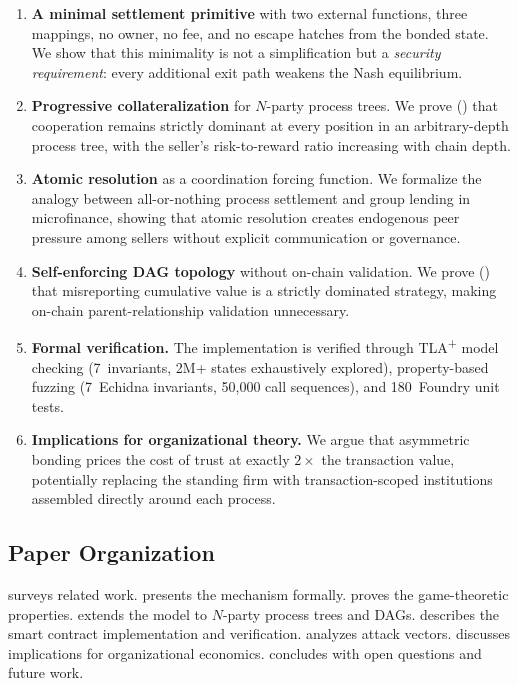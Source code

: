 \documentclass[11pt,a4paper]{article}
\theoremstyle{definition}
\theoremstyle{remark}
\begin{document}
\begin{enumerate}[label=(\roman*)]
  \item \textbf{A minimal settlement primitive} with two external
    functions, three mappings, no owner, no fee, and no escape hatches
    from the bonded state. We show that this minimality is not a
    simplification but a \emph{security requirement}: every additional
    exit path weakens the Nash equilibrium.

  \item \textbf{Progressive collateralization} for $N$-party process
    trees. We prove () that cooperation remains
    strictly dominant at every position in an arbitrary-depth process
    tree, with the seller's risk-to-reward ratio increasing with chain
    depth.

  \item \textbf{Atomic resolution} as a coordination forcing function.
    We formalize the analogy between all-or-nothing process settlement
    and group lending in microfinance, showing that atomic resolution
    creates endogenous peer pressure among sellers without explicit
    communication or governance.

  \item \textbf{Self-enforcing DAG topology} without on-chain
    validation. We prove () that
    misreporting cumulative value is a strictly dominated strategy,
    making on-chain parent-relationship validation unnecessary.

  \item \textbf{Formal verification.} The implementation is verified
    through TLA\textsuperscript{+} model checking (7~invariants,
    2M+ states exhaustively explored), property-based fuzzing (7~Echidna
    invariants, 50{,}000 call sequences), and 180~Foundry unit tests.

  \item \textbf{Implications for organizational theory.} We argue that
    asymmetric bonding prices the cost of trust at exactly $2\times$ the
    transaction value, potentially replacing the standing firm with
    transaction-scoped institutions assembled directly around each
    process.
\end{enumerate}

\subsection{Paper Organization}

 surveys related work.  presents
the mechanism formally.  proves the game-theoretic
properties.  extends the model to $N$-party
process trees and DAGs.  describes the smart
contract implementation and verification.  analyzes
attack vectors.  discusses implications for
organizational economics.  concludes with open
questions and future work.
\end{document}
